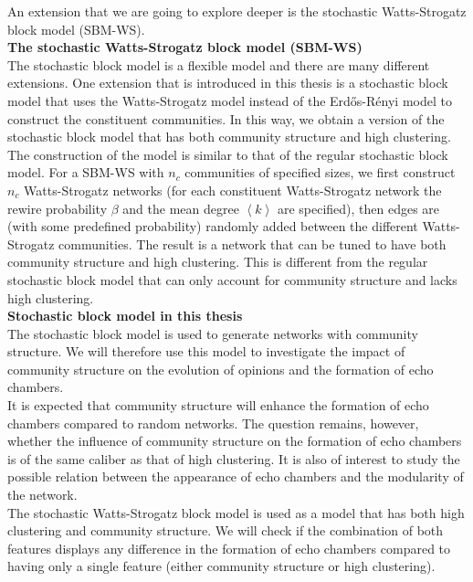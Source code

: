\documentclass[11 pt , letterpaper , twoside , openright]{book}
\begin{document}
\newline
An extension that we are going to explore deeper is the stochastic Watts-Strogatz block model (SBM-WS).\\
\newline
\textbf{The stochastic Watts-Strogatz block model (SBM-WS)}\\
\newline
The stochastic block model is a flexible model and there are many different extensions. One extension that is introduced in this thesis is a stochastic block model that uses the Watts-Strogatz model instead of the Erd\H{o}s-R\'{e}nyi model to construct the constituent communities. In this way, we obtain a version of the stochastic block model that has both community structure and high clustering.\\
\newline
The construction of the model is similar to that of the regular stochastic block model. For a SBM-WS with $n_c$ communities of specified sizes, we first construct $n_c$ Watts-Strogatz networks (for each constituent Watts-Strogatz network the rewire probability $\beta$ and the mean degree $\left<k\right>$ are specified), then edges are (with some predefined probability) randomly added between the different Watts-Strogatz communities. The result is a network that can be tuned to have both community structure and high clustering. This is different from the regular stochastic block model that can only account for community structure and lacks high clustering.\\
\newline
\textbf{Stochastic block model in this thesis}\\
\newline
The stochastic block model is used to generate networks with community structure. We will therefore use this model to investigate the impact of community structure on the evolution of opinions and the formation of echo chambers.\\
\newline
It is expected that community structure will enhance the formation of echo chambers compared to random networks. The question remains, however, whether the influence of community structure on the formation of echo chambers is of the same caliber as that of high clustering. It is also of interest to study the possible relation between the appearance of echo chambers and the modularity of the network.\\
\newline
The stochastic Watts-Strogatz block model is used as a model that has both high clustering and community structure. We will check if the combination of both features displays any difference in the formation of echo chambers compared to having only a single feature (either community structure or high clustering).
\end{document}
